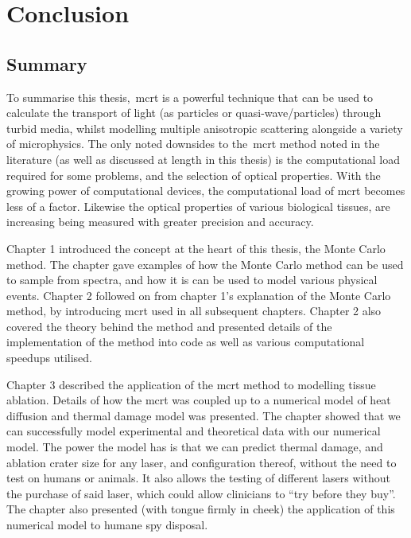 \chapter{Conclusion}

\section{Summary}

To summarise this thesis,~\gls*{mcrt} is a powerful technique that can be used to calculate the transport of light (as particles or quasi-wave/particles) through turbid media, whilst modelling multiple anisotropic scattering alongside a variety of microphysics.
The only noted downsides to the~\gls*{mcrt} method noted in the literature (as well as discussed at length in this thesis) is the computational load required for some problems, and the selection of optical properties.
With the growing power of computational devices, the computational load of \gls*{mcrt} becomes less of a factor.
Likewise the optical properties of various biological tissues, are increasing being measured with greater precision and accuracy.

\medskip

Chapter 1 introduced the concept at the heart of this thesis, the Monte Carlo method.
The chapter gave examples of how the Monte Carlo method can be used to sample from spectra, and how it is can be used to model various physical events.
Chapter 2 followed on from chapter 1's explanation of the Monte Carlo method, by introducing \gls*{mcrt} used in all subsequent chapters.
Chapter 2 also covered the theory behind the method and presented details of the implementation of the method into code as well as various computational speedups utilised.

\medskip

Chapter 3 described the application of the \gls*{mcrt} method to modelling tissue ablation.
Details of how the \gls*{mcrt} was coupled up to a numerical model of heat diffusion and thermal damage model was presented.
The chapter showed that we can successfully model experimental and theoretical data with our numerical model.
The power the model has is that we can predict thermal damage, and ablation crater size for any laser, and configuration thereof, without the need to test on humans or animals.
It also allows the testing of different lasers without the purchase of said laser, which could allow clinicians to ``try before they buy''.
The chapter also presented (with tongue firmly in cheek) the application of this numerical model to humane spy disposal.

